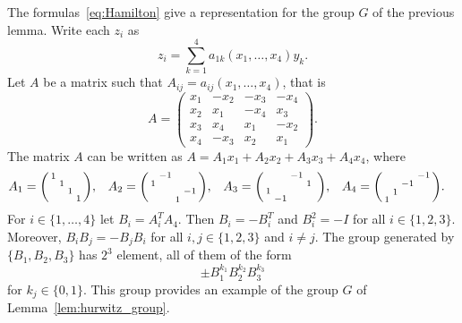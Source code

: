  \begin{example}
 	The formulas~\eqref{eq:Hamilton} give a representation for the
 	group $G$ of the previous lemma. Write each $z_i$ as 
 	\[
    z_i=\sum_{k=1}^4a_{1k}(x_1,\dots,x_4)y_k.
    \]
    Let $A$ be a matrix
 	such that 
 	$A_{ij}=a_{ij}(x_1,\dots,x_4)$, that is 
 	\[
 		A=\begin{pmatrix}
 			x_1 & -x_2 & -x_3 & -x_4\\
 			x_2 & x_1 & -x_4 & x_3\\
 			x_3 & x_4 & x_1 & -x_2\\
 			x_4 & -x_3 & x_2 & x_1
 		\end{pmatrix}.
 	\]
 	The matrix $A$ can be written as $A=A_1x_1+A_2x_2+A_3x_3+A_4x_4$, where
 	\begin{align*}
 		&A_1=\begin{psmallmatrix}
 		1\\
 		&1\\
 		&&1\\
 		&&&1\\
 		\end{psmallmatrix},
 		&&
 		A_2=\begin{psmallmatrix}
 			& -1\\
 			1 \\
 			&&&-1\\
 			&&1
 		\end{psmallmatrix},
 		&&
 		A_3=\begin{psmallmatrix}
 			&& -1 \\
 			&&&1 & \\
 			1\\
 			&-1
 		  \end{psmallmatrix},
 		  &&
 		  A_4=\begin{psmallmatrix}
 			&&&-1\\
 			&&-1\\
 			&1\\
 			1
 		\end{psmallmatrix}.
 	\end{align*}
 	For $i\in\{1,\dots,4\}$ let $B_i=A_i^TA_4$. Then
 	$B_i=-B_i^T$ and  $B_i^2=-I$ 
 	for all $i\in\{1,2,3\}$. Moreover, $B_iB_j=-B_jB_i$ for all $i,j\in\{1,2,3\}$ and
 	$i\ne j$.  
 	The group generated by $\{B_1,B_2,B_3\}$ has $2^3$ element, all of them
 	of the form
 	\[
 		\pm B_1^{k_1}B_2^{k_2}B_3^{k_3}
 	\]
 	for $k_j\in\{0,1\}$. This group provides an example 
    of the group $G$ of Lemma~\ref{lem:hurwitz_group}. 
    
 \end{example}

